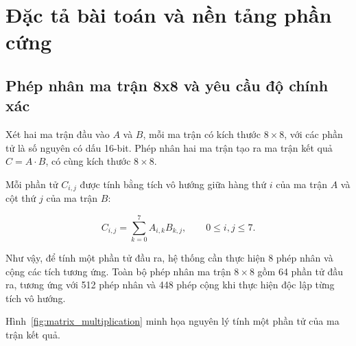 \section{Đặc tả bài toán và nền tảng phần cứng}


\subsection{Phép nhân ma trận 8x8 và yêu cầu độ chính xác}

Xét hai ma trận đầu vào $A$ và $B$, mỗi ma trận có kích thước
$8\times8$, với các phần tử là số nguyên có dấu 16-bit.
Phép nhân hai ma trận tạo ra ma trận kết quả $C=A\cdot B$,
có cùng kích thước $8\times8$.

Mỗi phần tử $C_{i,j}$ được tính bằng tích vô hướng giữa
hàng thứ $i$ của ma trận $A$ và cột thứ $j$ của ma trận $B$:

\begin{equation}
C_{i,j} = \sum_{k=0}^{7} A_{i,k}B_{k,j},
\qquad 0 \leq i,j \leq 7.
\tag{2.1}
\end{equation}

Như vậy, để tính một phần tử đầu ra, hệ thống cần thực hiện
8 phép nhân và cộng các tích tương ứng. Toàn bộ phép nhân
ma trận $8\times8$ gồm 64 phần tử đầu ra, tương ứng với
512 phép nhân và 448 phép cộng khi thực hiện độc lập
từng tích vô hướng.

Hình~\ref{fig:matrix_multiplication} minh họa nguyên lý
tính một phần tử của ma trận kết quả.

